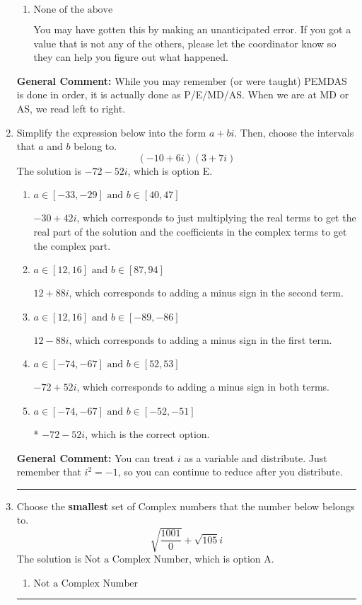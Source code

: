 \documentclass{extbook}[14pt]
\newcommand{\litem}[1]{\item #1

\rule{\textwidth}{0.4pt}}
\begin{document}
\begin{enumerate}
{\begin{enumerate}[label=\Alph*.]
 3.005, which corresponds to an Order of Operations error: not reading left-to-right for multiplication/division.
\item \( \text{None of the above} \)

 You may have gotten this by making an unanticipated error. If you got a value that is not any of the others, please let the coordinator know so they can help you figure out what happened.
\end{enumerate}

\textbf{General Comment:} While you may remember (or were taught) PEMDAS is done in order, it is actually done as P/E/MD/AS. When we are at MD or AS, we read left to right.
}
\litem{
Simplify the expression below into the form $a+bi$. Then, choose the intervals that $a$ and $b$ belong to.
\[ (-10 + 6 i)(3 + 7 i) \]The solution is \( -72 - 52 i \), which is option E.\begin{enumerate}[label=\Alph*.]
\item \( a \in [-33, -29] \text{ and } b \in [40, 47] \)

 $-30 + 42 i$, which corresponds to just multiplying the real terms to get the real part of the solution and the coefficients in the complex terms to get the complex part.
\item \( a \in [12, 16] \text{ and } b \in [87, 94] \)

 $12 + 88 i$, which corresponds to adding a minus sign in the second term.
\item \( a \in [12, 16] \text{ and } b \in [-89, -86] \)

 $12 - 88 i$, which corresponds to adding a minus sign in the first term.
\item \( a \in [-74, -67] \text{ and } b \in [52, 53] \)

 $-72 + 52 i$, which corresponds to adding a minus sign in both terms.
\item \( a \in [-74, -67] \text{ and } b \in [-52, -51] \)

* $-72 - 52 i$, which is the correct option.
\end{enumerate}

\textbf{General Comment:} You can treat $i$ as a variable and distribute. Just remember that $i^2=-1$, so you can continue to reduce after you distribute.
}
\litem{
Choose the \textbf{smallest} set of Complex numbers that the number below belongs to.
\[ \sqrt{\frac{1001}{0}}+\sqrt{105} i \]The solution is \( \text{Not a Complex Number} \), which is option A.\begin{enumerate}[label=\Alph*.]
\item \( \text{Not a Complex Number} \)


\end{enumerate}}
\end{enumerate}
\end{document}
